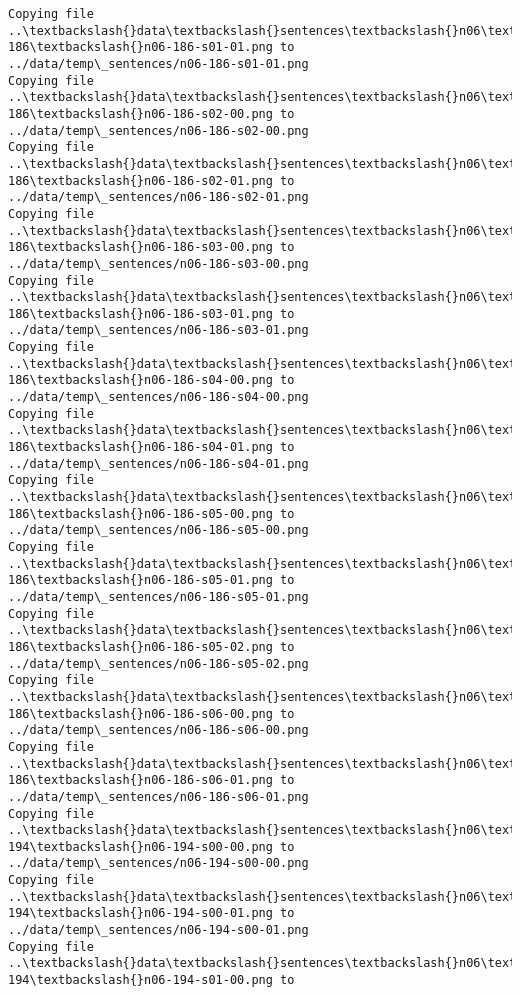 \documentclass[11pt]{article}
\begin{document}
\begin{Verbatim}[commandchars=\\\{\}]
Copying file ..\textbackslash{}data\textbackslash{}sentences\textbackslash{}n06\textbackslash{}n06-186\textbackslash{}n06-186-s01-01.png to
../data/temp\_sentences/n06-186-s01-01.png
Copying file ..\textbackslash{}data\textbackslash{}sentences\textbackslash{}n06\textbackslash{}n06-186\textbackslash{}n06-186-s02-00.png to
../data/temp\_sentences/n06-186-s02-00.png
Copying file ..\textbackslash{}data\textbackslash{}sentences\textbackslash{}n06\textbackslash{}n06-186\textbackslash{}n06-186-s02-01.png to
../data/temp\_sentences/n06-186-s02-01.png
Copying file ..\textbackslash{}data\textbackslash{}sentences\textbackslash{}n06\textbackslash{}n06-186\textbackslash{}n06-186-s03-00.png to
../data/temp\_sentences/n06-186-s03-00.png
Copying file ..\textbackslash{}data\textbackslash{}sentences\textbackslash{}n06\textbackslash{}n06-186\textbackslash{}n06-186-s03-01.png to
../data/temp\_sentences/n06-186-s03-01.png
Copying file ..\textbackslash{}data\textbackslash{}sentences\textbackslash{}n06\textbackslash{}n06-186\textbackslash{}n06-186-s04-00.png to
../data/temp\_sentences/n06-186-s04-00.png
Copying file ..\textbackslash{}data\textbackslash{}sentences\textbackslash{}n06\textbackslash{}n06-186\textbackslash{}n06-186-s04-01.png to
../data/temp\_sentences/n06-186-s04-01.png
Copying file ..\textbackslash{}data\textbackslash{}sentences\textbackslash{}n06\textbackslash{}n06-186\textbackslash{}n06-186-s05-00.png to
../data/temp\_sentences/n06-186-s05-00.png
Copying file ..\textbackslash{}data\textbackslash{}sentences\textbackslash{}n06\textbackslash{}n06-186\textbackslash{}n06-186-s05-01.png to
../data/temp\_sentences/n06-186-s05-01.png
Copying file ..\textbackslash{}data\textbackslash{}sentences\textbackslash{}n06\textbackslash{}n06-186\textbackslash{}n06-186-s05-02.png to
../data/temp\_sentences/n06-186-s05-02.png
Copying file ..\textbackslash{}data\textbackslash{}sentences\textbackslash{}n06\textbackslash{}n06-186\textbackslash{}n06-186-s06-00.png to
../data/temp\_sentences/n06-186-s06-00.png
Copying file ..\textbackslash{}data\textbackslash{}sentences\textbackslash{}n06\textbackslash{}n06-186\textbackslash{}n06-186-s06-01.png to
../data/temp\_sentences/n06-186-s06-01.png
Copying file ..\textbackslash{}data\textbackslash{}sentences\textbackslash{}n06\textbackslash{}n06-194\textbackslash{}n06-194-s00-00.png to
../data/temp\_sentences/n06-194-s00-00.png
Copying file ..\textbackslash{}data\textbackslash{}sentences\textbackslash{}n06\textbackslash{}n06-194\textbackslash{}n06-194-s00-01.png to
../data/temp\_sentences/n06-194-s00-01.png
Copying file ..\textbackslash{}data\textbackslash{}sentences\textbackslash{}n06\textbackslash{}n06-194\textbackslash{}n06-194-s01-00.png to

\end{Verbatim}
\end{document}
